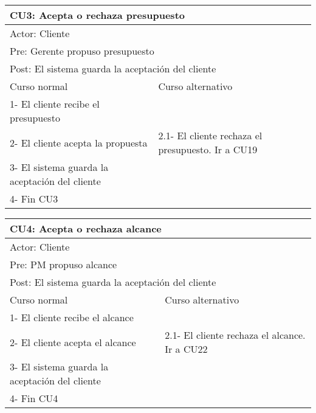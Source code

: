 \begin{table}[H]
  \begin{adjustbox}{max width = \textwidth}
  \begin{tabular}{|l|l|}
    \hline
    \multicolumn{2}{|l|}{CU3: Acepta o rechaza presupuesto} \\\hline
    \multicolumn{2}{|l|}{Actor: Cliente} \\\hline
    \multicolumn{2}{|l|}{Pre: Gerente propuso presupuesto} \\\hline
    \multicolumn{2}{|l|}{Post: El sistema guarda la aceptación del cliente} \\\hline
     Curso normal & Curso alternativo\\ \hline
     1- El cliente recibe el presupuesto & \\ \hline
     2- El cliente acepta la propuesta & 2.1- El cliente rechaza el presupuesto. Ir a CU19\\ \hline
     3- El sistema guarda la aceptación del cliente &\\ \hline
     4- Fin CU3 & \\ \hline
  \end{tabular}
  \end{adjustbox}
\end{table}

\begin{table}[H]
  \begin{adjustbox}{max width = \textwidth}
  \begin{tabular}{|l|l|}
    \hline
    \multicolumn{2}{|l|}{CU4: Acepta o rechaza alcance} \\\hline
    \multicolumn{2}{|l|}{Actor: Cliente} \\\hline
    \multicolumn{2}{|l|}{Pre: PM propuso alcance} \\\hline
    \multicolumn{2}{|l|}{Post: El sistema guarda la aceptación del cliente} \\\hline
     Curso normal & Curso alternativo\\ \hline
     1- El cliente recibe el alcance & \\ \hline
     2- El cliente acepta el alcance & 2.1- El cliente rechaza el alcance. Ir a CU22\\ \hline
     3- El sistema guarda la aceptación del cliente  &\\ \hline
     4- Fin CU4 & \\ \hline
  \end{tabular}
  \end{adjustbox}
\end{table}

